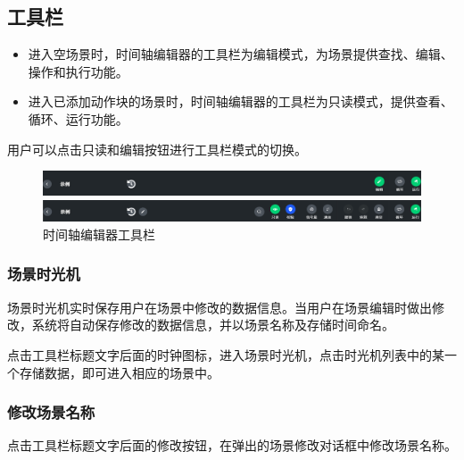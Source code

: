 

\subsection{工具栏}

\begin{itemize}
	\item 进入空场景时，时间轴编辑器的工具栏为编辑模式，为场景提供查找、编辑、操作和执行功能。
\item 进入已添加动作块的场景时，时间轴编辑器的工具栏为只读模式，提供查看、循环、运行功能。
\end{itemize}

用户可以点击只读和编辑按钮进行工具栏模式的切换。

\begin{figure}[ht]
	\centering
	\includegraphics[width=\textwidth]{image/07/图3.14 工具栏只读模式.png}

	\includegraphics[width=\textwidth]{image/07/图3.14 工具栏编辑模式.png}
	\caption{时间轴编辑器工具栏}
	\label{fig:时间轴编辑器工具栏}
\end{figure}

\subsubsection{场景时光机}
场景时光机实时保存用户在场景中修改的数据信息。当用户在场景编辑时做出修改，系统将自动保存修改的数据信息，并以场景名称及存储时间命名。

点击工具栏标题文字后面的时钟图标，进入场景时光机，点击时光机列表中的某一个存储数据，即可进入相应的场景中。


\subsubsection{修改场景名称}
点击工具栏标题文字后面的修改按钮，在弹出的场景修改对话框中修改场景名称。
